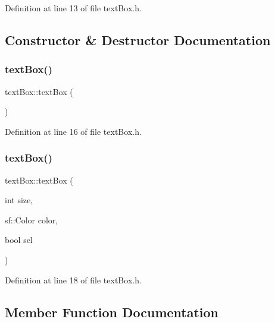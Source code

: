 Definition at line 13 of file text\+Box.\+h.



\subsection{Constructor \& Destructor Documentation}
\mbox{\label{classtext_box_ae2978707ad54e9a02106694370acfe6f}} 
\subsubsection{\texorpdfstring{text\+Box()}{textBox()}\hspace{0.1cm}{\footnotesize\ttfamily [1/2]}}
{\footnotesize\ttfamily text\+Box\+::text\+Box (\begin{DoxyParamCaption}{ }\end{DoxyParamCaption})\hspace{0.3cm}{\ttfamily [inline]}}



Definition at line 16 of file text\+Box.\+h.

\mbox{\label{classtext_box_a5a70337146669e9bfadb15d16f67db37}} 
\subsubsection{\texorpdfstring{text\+Box()}{textBox()}\hspace{0.1cm}{\footnotesize\ttfamily [2/2]}}
{\footnotesize\ttfamily text\+Box\+::text\+Box (\begin{DoxyParamCaption}\item[{int}]{size,  }\item[{sf\+::\+Color}]{color,  }\item[{bool}]{sel }\end{DoxyParamCaption})\hspace{0.3cm}{\ttfamily [inline]}}



Definition at line 18 of file text\+Box.\+h.



\subsection{Member Function Documentation}
\mbox{\label{classtext_box_a27b3756c0fabe55db09145a30adb793e}} 
